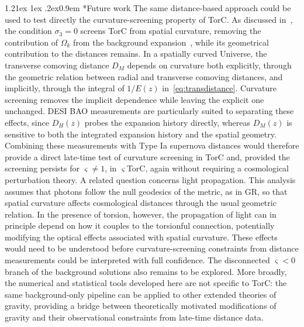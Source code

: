 \documentclass[aps,prd,reprint,preprintnumbers,showpacs,floatfix,nofootinbib,superscriptaddress]{revtex4-2}
\makeatletter
\renewcommand{\paragraph}{%
\@startsection{paragraph}{4}%
{\z@}{1.21ex \@plus 1ex \@minus .2ex}{0.9em}%
{\normalfont\normalsize\bfseries}%
}
\makeatother
\begin{document}
\paragraph*{Future work} The same distance-based approach could be used to test directly the curvature-screening property of TorC. As discussed in~\cite{Barker:2020elg}, the condition $\sigma_3=0$ screens TorC from spatial curvature, removing the contribution of $\Omega_k$ from the background expansion~\citep{Barker:2020gcp}, while its geometrical contribution to the distances remains. In a spatially curved Universe, the transverse comoving distance $D_M$ depends on curvature both explicitly, through the geometric relation between radial and transverse comoving distances, and implicitly, through the integral of $1/E(z)$ in~\cref{eq:transdistance}. Curvature screening removes the implicit dependence while leaving the explicit one unchanged. DESI BAO measurements are particularly suited to separating these effects, since $D_H(z)$ probes the expansion history directly, whereas $D_M(z)$ is sensitive to both the integrated expansion history and the spatial geometry. Combining these measurements with Type Ia supernova distances would therefore provide a direct late-time test of curvature screening in TorC and, provided the screening persists for $\varsigma\neq1$, in $\varsigma$TorC, again without requiring a cosmological perturbation theory. A related question concerns light propagation. This analysis assumes that photons follow the null geodesics of the metric, as in GR, so that spatial curvature affects cosmological distances through the usual geometric relation. In the presence of torsion, however, the propagation of light can in principle depend on how it couples to the torsionful connection, potentially modifying the optical effects associated with spatial curvature. These effects would need to be understood before curvature-screening constraints from distance measurements could be interpreted with full confidence. The disconnected $\varsigma<0$ branch of the background solutions also remains to be explored. More broadly, the numerical and statistical tools developed here are not specific to TorC: the same background-only pipeline can be applied to other extended theories of gravity, providing a bridge between theoretically motivated modifications of gravity and their observational constraints from late-time distance data.
\end{document}

